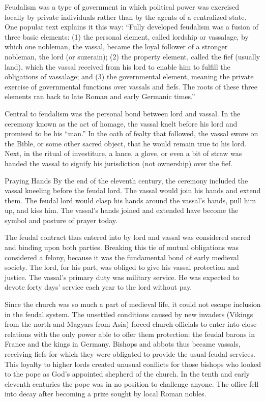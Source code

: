Feudalism was a type of government in which political power was exercised locally by private
individuals rather than by the agents of a centralized state. One popular text explains it this way:
“Fully developed feudalism was a fusion of three basic elements: (1) the personal element, called
lordship or vassalage, by which one nobleman, the vassal, became the loyal follower of a stronger
nobleman, the lord (or suzerain); (2) the property element, called the fief (usually land), which
the vassal received from his lord to enable him to fulfill the obligations of vassalage; and (3) the
governmental element, meaning the private exercise of governmental functions over vassals and fiefs.
The roots of these three elements ran back to late Roman and early Germanic times.”

Central to feudalism was the personal bond between lord and vassal. In the ceremony known as the act
of homage, the vassal knelt before his lord and promised to be his “man.” In the oath of fealty that
followed, the vassal swore on the Bible, or some other sacred object, that he would remain true to
his lord. Next, in the ritual of investiture, a lance, a glove, or even a bit of straw was handed
the vassal to signify his jurisdiction (not ownership) over the fief.

\begin{sidebar}{Praying Hands}
By the end of the eleventh century, the ceremony included the vassal kneeling before the feudal
lord. The vassal would join his hands and extend them. The feudal lord would clasp his hands around
the vassal’s hands, pull him up, and kiss him. The vassal’s hands joined and extended have become
the symbol and posture of prayer today.
\end{sidebar}

The feudal contract thus entered into by lord and vassal was considered sacred and binding upon both
parties. Breaking this tie of mutual obligations was considered a felony, because it was the
fundamental bond of early medieval society. The lord, for his part, was obliged to give his vassal
protection and justice. The vassal’s primary duty was military service. He was expected to devote
forty days’ service each year to the lord without pay.

Since the church was so much a part of medieval life, it could not escape inclusion in the feudal
system. The unsettled conditions caused by new invaders (Vikings from the north and Magyars from
Asia) forced church officials to enter into close relations with the only power able to offer them
protection: the feudal barons in France and the kings in Germany. Bishops and abbots thus became
vassals, receiving fiefs for which they were obligated to provide the usual feudal services. This
loyalty to higher lords created unusual conflicts for those bishops who looked to the pope as God’s
appointed shepherd of the church. In the tenth and early eleventh centuries the pope was in no
position to challenge anyone. The office fell into decay after becoming a prize sought by local
Roman nobles.

